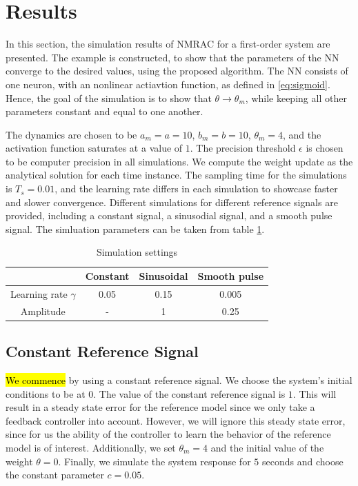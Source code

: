 \section{Results}

In this section, the simulation results of NMRAC for a first-order system are presented. The example is constructed, to show that the parameters of the NN converge to the desired values, using the proposed algorithm. The NN consists of one neuron, with an nonlinear actiavtion function, as defined in \eqref{eq:sigmoid}. Hence, the goal of the simulation is to show that $\theta\rightarrow\theta_m$, while keeping all other parameters constant and equal to one another.

The dynamics are chosen to be $a_m=a=10$, $b_m=b=10$, $\theta_m=4$, and the activation function saturates at a value of $1$. The precision threshold $\epsilon$ is chosen to be computer precision in all simulations. We compute the weight update as the analytical solution for each time instance. The sampling time for the simulations is $T_s=0.01$, and the learning rate differs in each simulation to showcase faster and slower convergence. Different simulations for different reference signals are provided, including a constant signal, a sinusodial signal, and a smooth pulse signal. The simluation parameters can be taken from table \ref{tab:sim-settings}.

\begin{table}
    \centering
    \caption{Simulation settings}\label{tab:sim-settings}
    \begin{tabular}{ c c c c } 
            \hline
            & Constant  & Sinusoidal  & Smooth pulse \\
            \hline 
            Learning rate $\gamma$ & 0.05 & 0.15 & 0.005\\ 
            Amplitude & - & 1 & 0.25 \\
            \hline
        \end{tabular}
\end{table}

\subsection{Constant Reference Signal}
\hl{We commence} by using a constant reference signal. We choose the system's initial conditions to be at $0$. The value of the constant reference signal is $1$. This will result in a steady state error for the reference model since we only take a feedback controller into account. However, we will ignore this steady state error, since for us the ability of the controller to learn the behavior of the reference model is of interest. Additionally, we set $\theta_m=4$ and the initial value of the weight $\theta=0$. Finally, we simulate the system response for $5$ seconds and choose the constant parameter $c=0.05$.

